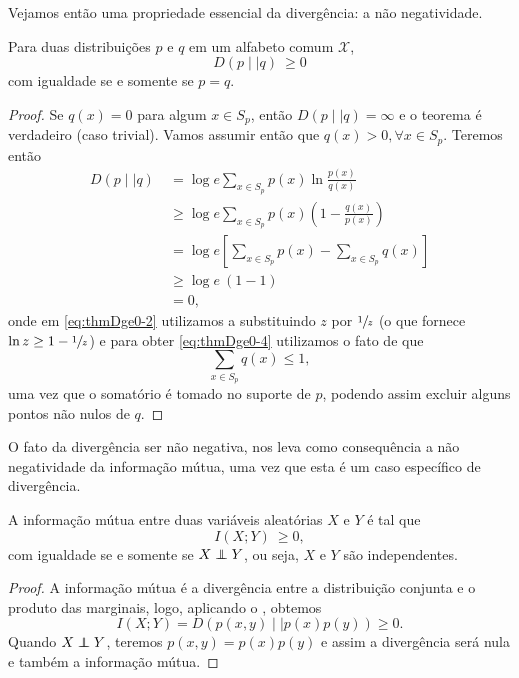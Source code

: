Vejamos então uma propriedade essencial da divergência: a não negatividade.
\begin{theorem}\label{thm-divnn}
Para duas distribuições $p$ e $q$ em um alfabeto comum $\mathcal{X}$,
\begin{equation}
D(p \mid\mid q) \: \geq 0 
\end{equation}
com igualdade se e somente se $p=q$.
\end{theorem}
\begin{proof}
Se $q(x) = 0$ para algum $x \in S_p$, então $D(p \mid\mid q) = \infty$ e o teorema é verdadeiro
(caso trivial).
Vamos assumir então que $q(x) > 0, \forall x \in S_p$. Teremos então
\begin{subequations}\label{eq:thmDge0}
\begin{align}
 D(p \mid\mid q) \: &= \log e \sum_{x \in S_p} p(x) \ln \frac{p(x)}{q(x)} \\
   &\geq \log e \sum_{x \in S_p} p(x) \left( 1 - \frac{q(x)}{p(x)} \right) \label{eq:thmDge0-2} \\
   &= \log e \left[ \sum_{x \in S_p} p(x) - \sum_{x \in S_p} q(x) \right] \\
   &\geq \log e \: (1 - 1) \label{eq:thmDge0-4}\\
   &= 0 ,
\end{align}
\end{subequations}
onde em \ref{eq:thmDge0-2} utilizamos a  substituindo $z$ por $\sfrac{1}{z}$ 
(o que fornece $\ln z \geq 1 - \sfrac{1}{z}$) e para obter \ref{eq:thmDge0-4} utilizamos o fato
de que
\begin{equation}
 \sum_{x \in S_p} q(x) \leq 1 ,
\end{equation}
uma vez que o somatório é tomado no suporte de $p$, podendo assim excluir alguns pontos não nulos de $q$.
\end{proof}

O fato da divergência ser não negativa, nos leva como consequência
a não negatividade da informação mútua, uma vez que esta é um caso específico
de divergência.
\begin{lemma}
A informação mútua entre duas variáveis aleatórias $X$ e $Y$ é tal que
\begin{equation}
 I(X;Y) \: \geq 0 ,
\end{equation}
com igualdade se e somente se $X \independent Y$, ou seja, $X$ e $Y$ são independentes.
\end{lemma}
\begin{proof}
A informação mútua é a divergência entre a distribuição conjunta e o produto das marginais, logo,
aplicando o , obtemos
\begin{equation}
 I(X;Y) = D(p(x,y) \mid\mid p(x)p(y)) \geq 0 .
\end{equation}
Quando $X \independent Y$, teremos $p(x,y) = p(x)p(y)$ e assim a divergência será nula
e também a informação mútua.
\end{proof}



